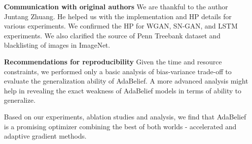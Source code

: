\textbf{Communication with original authors} We are thankful to the author Juntang Zhuang. He helped us with the implementation and HP details for various experiments. We confirmed the HP for WGAN, SN-GAN, and LSTM experiments. We also clarified the source of Penn Treebank dataset and blacklisting of images in ImageNet.

\textbf{Recommendations for reproducibility} Given the time and resource constraints, we performed only a basic analysis of bias-variance trade-off to evaluate the generalization ability of AdaBelief. A more advanced analysis might help in revealing the exact weakness of AdaBelief models in terms of ability to generalize.

Based on our experiments, ablation studies and analysis, we find that AdaBelief is a promising optimizer combining the best of both worlds - accelerated and adaptive gradient methods.



